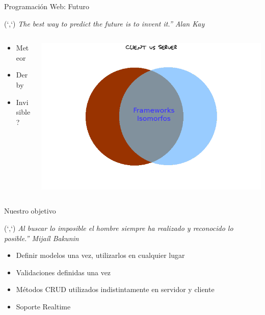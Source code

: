\documentclass[xcolor=dvipsnames, 14pt]{beamer}
\newenvironment{reference}[2]{%
  \begin{textblock*}{\textwidth}(#1,#2)
      \footnotesize\it\bgroup\color{gray!50!black}}{\egroup\end{textblock*}}
\begin{document}
\begin{frame}{Programación Web: Futuro}
\begin{reference}{4mm}{13mm}
``The best way to predict the future is to invent it.'' Alan Kay
\end{reference}

\begin{columns}
    \begin{column}{0.3\textwidth}
        \begin{itemize}
            \item Meteor
            \item Derby
            \item Invisible?
        \end{itemize}
    \end{column}
    \begin{column}{0.7\textwidth}
        \begin{center}
            \includegraphics[width=\textwidth]{img/futuro.png}
        \end{center}
    \end{column}
\end{columns}

\end{frame}

\begin{frame}{Nuestro objetivo}
\begin{reference}{4mm}{85mm}
``Al buscar lo imposible el hombre siempre ha realizado y reconocido lo posible.'' Mijaíl Bakunin
\end{reference}

\begin{itemize}
    \item Definir modelos una vez, utilizarlos en cualquier lugar
    \item Validaciones definidas una vez
    \item Métodos CRUD utilizados indistintamente en servidor y cliente
    \item Soporte Realtime
\end{itemize}

\end{frame}
\end{document}
